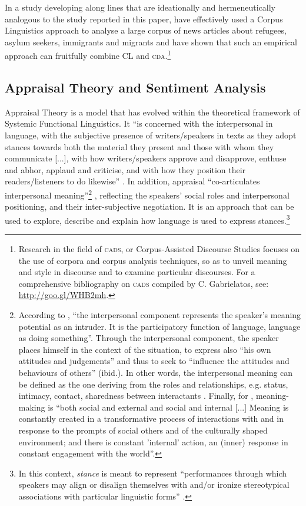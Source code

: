 \documentclass[output=paper]{LSP/langsci}
\begin{document}
In a study developing along lines that are ideationally and hermeneutically analogous to the study reported in this paper, \citet{BakerGabrielatos2008} have effectively used a Corpus Linguistics approach to analyse a large corpus of news articles about refugees, asylum seekers, immigrants and migrants and have shown that such an empirical approach can fruitfully combine CL and \textsc{cda}.\footnote{Research in the field of \textsc{cads}, or Corpus-Assisted Discourse Studies focuses on the use of corpora and corpus analysis techniques, so as to unveil meaning and style in discourse and to examine particular discourses. For a comprehensive bibliography on \textsc{cads} compiled by C. Gabrielatos, see: \url{http://goo.gl/WHB2mh}.}

\subsection{Appraisal Theory and Sentiment Analysis} \label{sec:2:2:3}
Appraisal Theory is a model that has evolved within the theoretical framework of Systemic Functional Linguistics. It “is concerned with the interpersonal in language, with the subjective presence of writers/speakers in texts as they adopt stances towards both the material they present and those with whom they communicate [...], with how writers/speakers approve and disapprove, enthuse and abhor, applaud and criticise, and with how they position their readers/listeners to do likewise” \citep[1]{MartinWhite2005}. In addition, appraisal “co-articulates interpersonal meaning”\footnote{According to \citet[112]{Halliday1978}, “the interpersonal component represents the speaker’s meaning potential as an intruder. It is the participatory function of language, language as doing something”. Through the interpersonal component, the speaker places himself in the context of the situation, to express also “his own attitudes and judgements” and thus to seek to “influence the attitudes and behaviours of others” (ibid.). In other words, the interpersonal meaning can be defined as the one deriving from the roles and relationships, e.g. status, intimacy, contact, sharedness between interactants \citep[49]{Eggins1997}. Finally, for \citet[94]{Kress2010}, meaning-making is “both social and external and social and internal [...] Meaning is constantly created in a transformative process of interactions with and in response to the prompts of social others and of the culturally shaped environment; and there is constant 'internal' action, an (inner) response in constant engagement with the world”.} \citep[33]{MartinWhite2005}, reflecting the speakers' social roles and interpersonal positioning, and their inter-subjective negotiation. It is an approach that can be used to explore, describe and explain how language is used to express stances.\footnote{In this context, \textit{stance} is meant to represent “performances through which speakers may align or disalign themselves with and/or ironize stereotypical associations with particular linguistic forms” \citep[4]{Jaffe2009}.}
\end{document}
